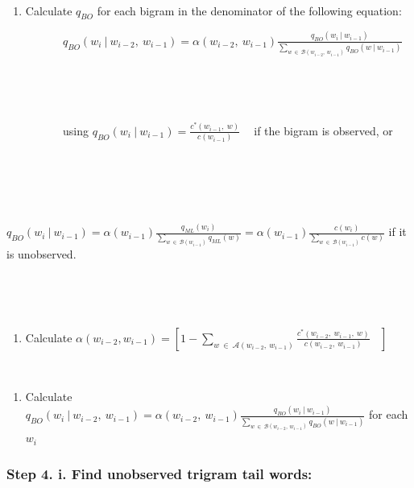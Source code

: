 \documentclass[
]{article}
\providecommand{\tightlist}{%
  \setlength{\itemsep}{0pt}\setlength{\parskip}{0pt}}
\begin{document}
~

\begin{enumerate}
\def\labelenumi{\roman{enumi}.}
\setcounter{enumi}{2}
\tightlist
\item
  Calculate \(q_{BO}\) for each bigram in the denominator of the
  following equation:
\end{enumerate}

~~~~~~~~~~\(q_{BO}(w_i\:|\:w_{i-2},\:w_{i-1}) = \alpha(w_{i-2},\:w_{i-1})\frac{q_{BO}(w_i\:|\:w_{i-1})}{\sum\limits_{w\:\in\:\mathcal{B}(w_{i-2},\:w_{i-1})}q_{BO}(w\:|\:w_{i-1})}\)

~

~

~~~~~~~~~~using
\(q_{BO}(w_i\:|\:w_{i-1}) = \frac{c^*(w_{i-1},\:w)}{c(w_{i-1})}\:\:\:\:\)
if the bigram is observed, or

~

~

~~~~~~~~~~\(q_{BO}(w_i\:|\:w_{i-1}) = \alpha(w_{i-1})\frac{q_{ML}(w_i)}{\sum\limits_{w\:\in\:\mathcal{B}(w_{i-1})}q_{ML}(w)} = \alpha(w_{i-1})\frac{c(w_i)}{\sum\limits_{w\:\in\:\mathcal{B}(w_{i-1})}c(w)}\)
if it is unobserved.

~

~

\begin{enumerate}
\def\labelenumi{\roman{enumi}.}
\setcounter{enumi}{3}
\tightlist
\item
  Calculate
  \(\alpha(w_{i−2},w_{i−1}) = \left [ 1 - \sum\limits_{w\:\in\:\mathcal{A}(w_{i-2},\:w_{i-1})} \frac{c^*(w_{i-2},\:w_{i-1},\:w)}{c(w_{i-2},\:w_{i-1})}\:\:\:\:\right]\)
  ~
\end{enumerate}

~

\begin{enumerate}
\def\labelenumi{\alph{enumi}.}
\setcounter{enumi}{21}
\tightlist
\item
  Calculate
  \(q_{BO}(w_i\:|\:w_{i-2},\:w_{i-1}) = \alpha(w_{i-2},\:w_{i-1})\frac{q_{BO}(w_i\:|\:w_{i-1})}{\sum\limits_{w\:\in\:\mathcal{B}(w_{i-2},\:w_{i-1})}q_{BO}(w\:|\:w_{i-1})}\)
  for each \(w_i\) ~
\end{enumerate}

\hypertarget{step-4.-i.-find-unobserved-trigram-tail-words}{%
\subsubsection{Step 4. i. Find unobserved trigram tail
words:}\label{step-4.-i.-find-unobserved-trigram-tail-words}}
\end{document}
